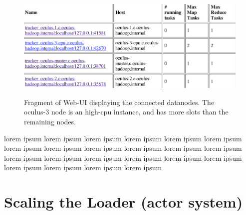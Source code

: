 \begin{figure}[ch!]
  \centering
  \includegraphics[width=\textwidth]{img/hadoop/4node-cluster-config}
  \label{fig:four-nodes-config}
  \caption{Fragment of Web-UI displaying the connected datanodes. The oculus-3 node is an high-cpu instance, and has more slots than the remaining nodes.}
\end{figure}

lorem ipsum lorem ipsum lorem ipsum lorem ipsum lorem ipsum lorem ipsum lorem ipsum lorem ipsum lorem ipsum lorem ipsum lorem ipsum lorem ipsum lorem ipsum lorem ipsum lorem ipsum lorem ipsum lorem ipsum lorem ipsum lorem ipsum lorem ipsum lorem ipsum lorem ipsum 


\section{Scaling the Loader (actor system)}
\label{sec:scaling-akka}

